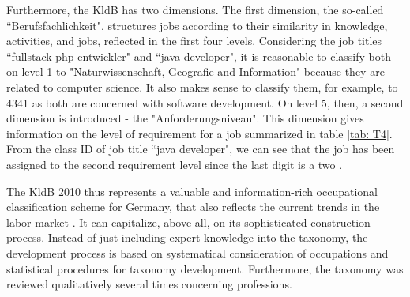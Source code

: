 \documentclass[12pt, a4paper, titlepage]{article}
\begin{document}
Furthermore, the \ac{KldB} has two dimensions. The first dimension, the so-called ``Berufsfachlichkeit", structures jobs according to their similarity in knowledge, activities, and jobs, reflected in the first four levels. Considering the job titles ``fullstack php-entwickler" and ``java developer", it is reasonable to classify both on level 1 to "Naturwissenschaft, Geografie and Information" because they are related to computer science. It also makes sense to classify them, for example, to 4341 as both are concerned with software development. On level 5, then, a second dimension is introduced - the "Anforderungsniveau". This dimension gives information on the level of requirement for a job summarized in table \ref{tab: T4}. From the class ID of job title ``java developer", we can see that the job has been assigned to the second requirement level since the last digit is a two \citep{Bundesagentur2011a, Bundesagentur2011b, Paulus2013}. 

\begin{table}[hb!]
  \caption[Level of Requirements on Level 5]{\label{tab: T4} Level of Requirements on Level 5 (adapted from \citep[2]{Bundesagentur2011b})}
  \end{table}

The \ac{KldB} 2010 thus represents a valuable and information-rich occupational classification scheme for Germany, that also reflects the current trends in the labor market \citep{Paulus2013}. It can capitalize, above all, on its sophisticated construction process. Instead of just including expert knowledge into the taxonomy, the development process is based on systematical consideration of occupations and statistical procedures for taxonomy development. Furthermore, the taxonomy was reviewed qualitatively several times concerning professions. 
\end{document}
